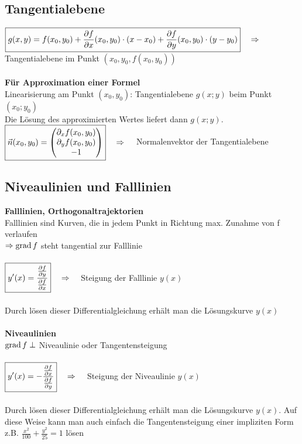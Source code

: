 \subsection{Tangentialebene}
$\boxed{g(x,y)=f(x_0,y_0)+\dfrac{\partial f}{\partial x}(x_0,y_0)\cdot(x-x_0)+\dfrac{\partial f}{\partial y}(x_0,y_0)\cdot(y-y_0)}
\quad \Rightarrow \quad$ Tangentialebene im Punkt $(x_0,y_0,f(x_0,y_0))$\\ \\
\textbf{Für Approximation einer Formel}\\
Linearisierung am Punkt $(x_0,y_0)$: Tangentialebene $g(x;y)$ beim Punkt
$(x_0;y_0)$\\
Die Lösung des approximierten Wertes liefert dann $g(x;y)$.\\

$\boxed{\vec{n}(x_0,y_0)=
\begin{pmatrix}
	\partial_{x} f(x_0,y_0)\\
	\partial_{y} f(x_0,y_0)\\
	-1\\                         
\end{pmatrix}} \quad \Rightarrow \quad$ Normalenvektor der Tangentialebene

\subsection{Niveaulinien und Falllinien}
\textbf{Falllinien, Orthogonaltrajektorien}\\
Falllinien sind Kurven, die in jedem Punkt in Richtung max. Zunahme von f
verlaufen\\
$\Rightarrow \operatorname{grad} f$ steht tangential zur Falllinie\\\\
$\boxed{y'(x)= \dfrac{\frac{\partial f}{\partial y}}{\frac{\partial f}{\partial x}}} \quad
\Rightarrow \quad$ Steigung der Falllinie $y(x)$\\\\
Durch lösen dieser Differentialgleichung erhält man
die Lösungskurve $y(x)$\\ \\
\textbf{Niveaulinien}\\
$\operatorname{grad} f \perp $ Niveaulinie oder Tangentensteigung\\\\
$\boxed{y'(x)=- \dfrac{\frac{\partial f}{\partial x}}{\frac{\partial f}{\partial y}}}\quad
\Rightarrow \quad$ Steigung der Niveaulinie $y(x)$\\\\
Durch lösen dieser Differentialgleichung erhält man
die Lösungskurve $y(x)$. Auf diese Weise kann man auch einfach die
Tangentensteigung einer impliziten Form z.B. $\frac{x^2}{100}+\frac{y^2}{25}=1$
lösen

